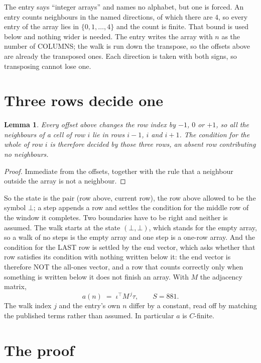 \documentclass[11pt,a4paper]{article}
\theoremstyle{plain}
\newtheorem{lemma}[theorem]{Lemma}
\theoremstyle{definition}
\begin{document}
The entry says ``integer arrays'' and names no alphabet, but one is forced. An entry counts
neighbours in the named directions, of which there are $4$, so every entry of the array
lies in $\{0,1,\dots,4\}$ and the count is finite. That bound is used below and
nothing wider is needed. The entry writes the array with $n$ as the number of COLUMNS; the walk is run down the transpose, so the offsets above are already the transposed ones. Each direction is taken with both signs, so transposing cannot lose one.

\section{Three rows decide one}

\begin{lemma}\label{lem:win}
Every offset above changes the row index by $-1$, $0$ or $+1$, so all the neighbours of a cell
of row $i$ lie in rows $i-1$, $i$ and $i+1$. The condition for the whole of row $i$ is
therefore decided by those three rows, an absent row contributing no neighbours.
\end{lemma}

\begin{proof}
Immediate from the offsets, together with the rule that a neighbour outside the array is not a
neighbour.
\end{proof}

So the state is the pair (row above, current row), the row above allowed to be the symbol
$\bot$; a step appends a row and settles the condition for the middle row of the window it
completes. Two boundaries have to be right and neither is assumed. The walk starts at the state
$(\bot,\bot)$, which stands for the empty array, so a walk of no steps is the empty array and
one step is a one-row array. And the condition for the LAST row is settled by the end vector,
which asks whether that row satisfies its condition with nothing written below it: the end
vector is therefore NOT the all-ones vector, and a row that counts correctly only when
something is written below it does not finish an array. With $M$ the adjacency matrix,
\[
a(n)\;=\;\iota^{\!\top}M^{\,j}\tau ,\qquad S=881.
\]
The walk index $j$ and the entry's own $n$ differ by a constant, read off by matching the
published terms rather than assumed. In particular $a$ is $C$-finite.

\section{The proof}
\end{document}
